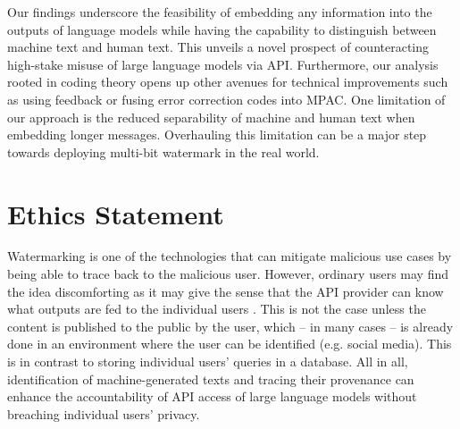 \vspace{-2mm}
Our findings underscore the feasibility of embedding any information into the outputs of language models while having the capability to distinguish between machine text and human text. This unveils a novel prospect of counteracting high-stake misuse of large language models via API. Furthermore, our analysis rooted in coding theory opens up other avenues for technical improvements such as using feedback or fusing error correction codes into MPAC. One limitation of our approach is the reduced separability of machine and human text when embedding longer messages. Overhauling this limitation can be a major step towards deploying multi-bit watermark in the real world.


\section{Ethics Statement}
Watermarking is one of the technologies that can mitigate malicious use cases by being able to trace back to the malicious user. However, ordinary users may find the idea discomforting as it may give the sense that the API provider can know what outputs are fed to the individual users . This is not the case unless the content is published to the public by the user, which -- in many cases -- is already done in an environment where the user can be identified (e.g. social media). This is in contrast to storing individual users' queries in a database. All in all, identification of machine-generated texts and tracing their provenance can enhance the accountability of API access of large language models without breaching individual users' privacy.  
